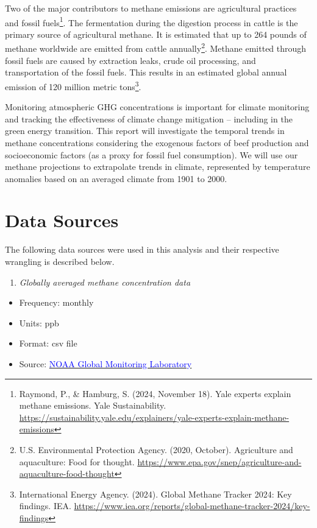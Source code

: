 \documentclass[
]{article}
\providecommand{\tightlist}{%
  \setlength{\itemsep}{0pt}\setlength{\parskip}{0pt}}
\begin{document}
Two of the major contributors to methane emissions are agricultural
practices and fossil fuels\footnote{Raymond, P., \& Hamburg, S. (2024,
  November 18). Yale experts explain methane emissions. Yale
  Sustainability.
  \url{https://sustainability.yale.edu/explainers/yale-experts-explain-methane-emissions}}.
The fermentation during the digestion process in cattle is the primary
source of agricultural methane. It is estimated that up to 264 pounds of
methane worldwide are emitted from cattle annually\footnote{U.S.
  Environmental Protection Agency. (2020, October). Agriculture and
  aquaculture: Food for thought.
  \url{https://www.epa.gov/snep/agriculture-and-aquaculture-food-thought}}.
Methane emitted through fossil fuels are caused by extraction leaks,
crude oil processing, and transportation of the fossil fuels. This
results in an estimated global annual emission of 120 million metric
tons\footnote{International Energy Agency. (2024). Global Methane
  Tracker 2024: Key findings. IEA.
  \url{https://www.iea.org/reports/global-methane-tracker-2024/key-findings}}.

Monitoring atmospheric GHG concentrations is important for climate
monitoring and tracking the effectiveness of climate change mitigation
-- including in the green energy transition. This report will
investigate the temporal trends in methane concentrations considering
the exogenous factors of beef production and socioeconomic factors (as a
proxy for fossil fuel consumption). We will use our methane projections
to extrapolate trends in climate, represented by temperature anomalies
based on an averaged climate from 1901 to 2000.

\section{Data Sources}\label{data-sources}

The following data sources were used in this analysis and their
respective wrangling is described below.

\begin{enumerate}
\def\labelenumi{\arabic{enumi}.}
\tightlist
\item
  \emph{Globally averaged methane concentration data}
\end{enumerate}

\begin{itemize}
\tightlist
\item
  Frequency: monthly
\item
  Units: ppb
\item
  Format: csv file
\item
  Source:
  \href{https://gml.noaa.gov/ccgg/trends_ch4/}{\textcolor{blue}{NOAA Global Monitoring Laboratory}}
\end{itemize}
\end{document}
